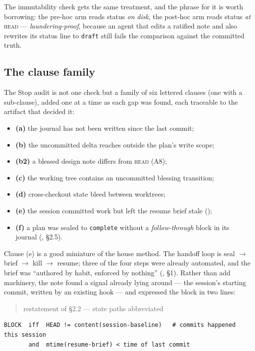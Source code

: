 The immutability check gets the same treatment, and the phrase for it is worth
borrowing: the pre-hoc arm reads status \emph{on disk}, the post-hoc arm reads
status \emph{at} \textsc{head} --- \emph{laundering-proof}, because an agent that
edits a ratified note and also rewrites its status line to \texttt{draft} still
fails the comparison against the committed truth.

\subsection*{The clause family}

The Stop audit is not one check but a family of six lettered clauses (one with a
sub-clause), added one at a time as each gap was found, each traceable to the
artifact that decided it:

\begin{itemize}[leftmargin=*,itemsep=1pt]
  \item \textbf{(a)} the journal has not been written since the last commit;
  \item \textbf{(b)} the uncommitted delta reaches outside the plan's write scope;
  \item \textbf{(b2)} a blessed design note differs from \textsc{head} (A8);
  \item \textbf{(c)} the working tree contains an uncommitted blessing transition;
  \item \textbf{(d)} cross-checkout state bleed between worktrees;
  \item \textbf{(e)} the session committed work but left the resume brief stale
    ();
  \item \textbf{(f)} a plan was sealed to \texttt{complete} without a
    \emph{follow-through} block in its journal
    (, \S 2.5).
\end{itemize}

Clause (e) is a good miniature of the house method. The handoff loop is seal
$\to$ brief $\to$ kill $\to$ resume; three of the four steps were already
automated, and the brief was ``authored by habit, enforced by nothing''
(, \S 1). Rather than add machinery, the note
found a signal already lying around --- the session's starting commit, written by
an existing hook --- and expressed the block in two lines:

\begin{quote}\small\ttfamily
restatement of  \S 2.2 --- state paths abbreviated
\end{quote}
{\small\begin{verbatim}
BLOCK  iff  HEAD != content(session-baseline)   # commits happened this session
       and  mtime(resume-brief) < time of last commit
\end{verbatim}}

